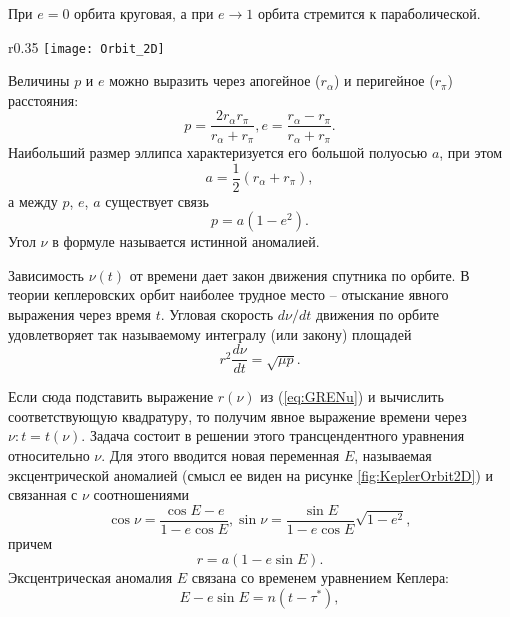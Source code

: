 При $e = 0$ орбита круговая, а при $e \rightarrow 1$
орбита стремится к параболической.
\begin{wrapfigure}{r}{0.35\textwidth}
  \centering
  \texttt{[image: Orbit\_2D]}
  \caption{Кеплерова эллиптическая орбита}
  \label{fig:KeplerOrbit2D}
\end{wrapfigure}
Величины $p$ и $e$ можно выразить через апогейное
($r_{\alpha}$) и перигейное ($r_{\pi}$) расстояния:
\begin{equation}
  p = \frac{2r_{\alpha}r_{\pi}}{r_{\alpha} + r_{\pi}},
  e = \frac{r_{\alpha} - r_{\pi}}{r_{\alpha} + r_{\pi}}.
\end{equation}
Наибольший размер эллипса характеризуется его большой полуосью $a$, при этом
\begin{equation}
  a = \frac{1}{2}(r_{\alpha} + r_{\pi}),
\end{equation}
а между $p$, $e$, $a$ существует связь
\begin{equation}
  p = a(1 - e^2).
\end{equation}
Угол $\nu$ в формуле \label{eq:GRENu} называется истинной аномалией.\par
Зависимость $\nu(t)$ от времени дает закон движения спутника по орбите. В теории
кеплеровских орбит наиболее трудное место -- отыскание явного выражения через время
$t$. Угловая скорость $d\nu/dt$ движения по орбите удовлетворяет так называемому
интегралу (или закону) площадей
\begin{equation} \label{eq:GIntegralSquares}
  r^2\frac{d\nu}{dt} = \sqrt{\mu p}.
\end{equation}\par
Если сюда подставить выражение $r(\nu)$ из (\ref{eq:GRENu}) и вычислить соответствующую
квадратуру, то получим явное выражение времени через $\nu: t = t(\nu)$. Задача состоит
в решении этого трансцендентного уравнения относительно $\nu$. Для этого вводится
новая переменная $E$, называемая эксцентрической аномалией (смысл ее виден на
рисунке \ref{fig:KeplerOrbit2D}) и связанная с $\nu$ соотношениями
\begin{equation}
  \cos\nu = \frac{\cos E - e}{1 - e\cos E}, \sin\nu = \frac{\sin E}{1 - e\cos E}\sqrt{1 - e^2},
\end{equation}
причем
\begin{equation}\label{eq:rFromEA}
  r = a(1 - e\sin E).
\end{equation}
Эксцентрическая аномалия $E$ связана со временем уравнением Кеплера:
\begin{equation} \label{eq:EscentricAnomaly}
  E - e\sin E = n(t-\tau^*),
\end{equation}

